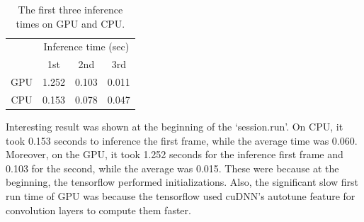 \documentclass[a4paper,12pt]{article}
\begin{document}
\begin{table}[!h]
	\centering
	\begin{tabular}{@{}cccc@{}}
		\toprule
		 & \multicolumn{3}{c}{Inference time (sec)} \\ \cmidrule(l){2-4} 
		  & 1st & 2nd & 3rd \\ \midrule
		  GPU & 1.252 & 0.103 & 0.011 \\ \midrule
		  CPU & 0.153 & 0.078 & 0.047 \\ \bottomrule
	\end{tabular}
	\caption{The first three inference times on GPU and CPU.}
	\label{tab:each_inference}
\end{table}

Interesting result was shown at the beginning of the ‘session.run’. On CPU, it took 0.153 seconds to inference the first frame, while the average time was 0.060.
Moreover, on the GPU, it took 1.252 seconds for the inference first frame and 0.103 for the second, while the average was 0.015.
These were because at the beginning, the tensorflow performed initializations. Also, the significant slow first run time of GPU was because the tensorflow used cuDNN’s autotune feature for convolution layers to compute them faster.  
\end{document}
